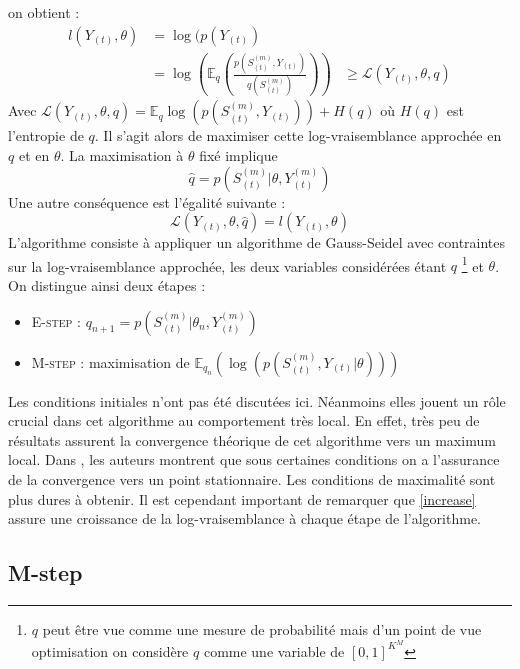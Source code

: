 \documentclass[10pt,a4paper]{article}
\newcommand{\Estep}{\textsc{E-step}}
\newcommand{\Mstep}{\textsc{M-step}}
\begin{document}
on obtient :
\begin{equation}
\begin{aligned}
l(Y_{(t)},\theta)&=\log(p(Y_{(t)}) \\
&=\log\left( \mathbb{E}_q\left( 
\frac{p(S_{(t)}^{(m)},Y_{(t)})}{q(S_{(t)}^{(m)})} \right) \right)
&\ge \mathcal{L}(Y_{(t)},\theta,q)
\end{aligned}
\end{equation}
Avec $\mathcal{L}(Y_{(t)},\theta,q)=\mathbb{E}_q \log \left( p(S_{(t)}^{(m)}, 
Y_{(t)})\right)+H(q)$ où $H(q)$ est l'entropie de $q$. Il s'agit alors de 
maximiser cette log-vraisemblance approchée en $q$ et en $\theta$. La 
maximisation à $\theta$ fixé implique 
\begin{equation}
\hat{q}=p(S_{(t)}^{(m)} \vert \theta,Y_{(t)}^{(m)})
\end{equation} 
Une autre conséquence est l'égalité suivante :
\begin{equation}
\mathcal{L}(Y_{(t)},\theta,\hat{q})=l(Y_{(t)},\theta) \label{increase}
\end{equation}
L'algorithme consiste à appliquer un algorithme de Gauss-Seidel avec 
contraintes sur la log-vraisemblance approchée, les deux variables considérées 
étant $q$ \footnote{$q$ peut être vue comme une mesure de probabilité mais d'un 
point de vue optimisation on considère $q$ comme une variable de $[0,1]^{K^M}$} 
et $\theta$. On distingue ainsi deux étapes :
\begin{itemize}
\item \Estep{} : $q_{n+1}=p(S_{(t)}^{(m)} \vert \theta_n,Y_{(t)}^{(m)})$
\item \Mstep{} : maximisation de $\mathbb{E}_{q_n} \left( \log \left( 
p(S_{(t)}^{(m)}, Y_{(t)}  \vert  \theta )\right) \right)$
\end{itemize}
Les conditions initiales n'ont pas été discutées ici. Néanmoins elles jouent un 
rôle crucial dans cet algorithme au comportement très local. En effet, très peu 
de résultats assurent la convergence théorique de cet algorithme vers un 
maximum local. Dans \cite{wu1983convergence}, les auteurs montrent que sous 
certaines conditions on a l'assurance de la convergence vers un point 
stationnaire. Les conditions de maximalité sont plus dures à obtenir. Il est 
cependant important de remarquer que \ref{increase} assure une croissance de la 
log-vraisemblance à chaque étape de l'algorithme.

\subsection{M-step}
\end{document}

